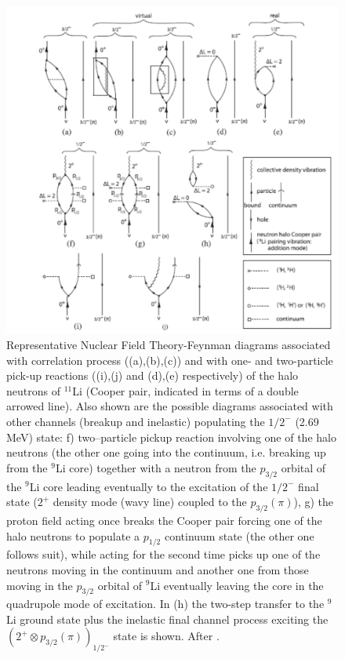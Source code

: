 \begin{subappendices}
  \begin{figure}
  \centerline{\includegraphics*[width=12cm,angle=0]{C8/figsC8/fig8_B_1x}}
  	\caption{Representative Nuclear Field Theory-Feynman diagrams associated with correlation process ((a),(b),(c)) and with one- and two-particle pick-up reactions ((i),(j) and (d),(e) respectively) of the halo neutrons of $^{11}$Li (Cooper pair, indicated in terms of a double arrowed line). Also shown are the possible diagrams associated with other channels (breakup and inelastic) populating the $1/2^-$ (2.69 MeV) state: f) two--particle pickup reaction involving one of the halo neutrons (the other one going into the continuum, i.e. breaking up from the $^9$Li core) together with a neutron from the $p_{3/2}$ orbital of the $^9$Li core  leading eventually to the excitation of the $1/2^-$ final state ($2^+$ density mode (wavy line) coupled to the $p_{3/2}(\pi)$), g) the proton field acting once breaks the Cooper pair forcing one of the halo neutrons to populate a $p_{1/2}$ continuum state (the other one follows suit), while acting for the second time picks up one of the neutrons moving in the continuum and another one from those moving in the $p_{3/2}$ orbital of $^9$Li eventually leaving the core in the quadrupole mode of excitation. In (h) the  two-step transfer to the $^9$Li ground state plus the inelastic final channel process exciting the $(2^+\otimes p_{3/2}(\pi))_{1/2^-}$ state is shown. After \cite{Potel:10}.}\label{fig8_B_1}
  \end{figure}

\end{subappendices}
